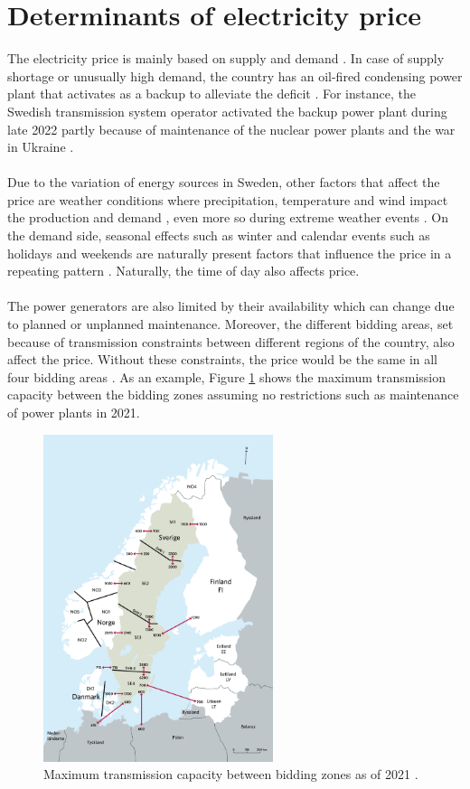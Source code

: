\section{Determinants of electricity price}\label{ch:factors}
The electricity price is mainly based on supply and demand \cite{NordPool}. In case of supply shortage or unusually high demand, the country has an oil-fired condensing power plant that activates as a backup to alleviate the deficit \cite{oilpower}. For instance, the Swedish transmission system operator activated the backup power plant during late 2022 partly because of maintenance of the nuclear power plants and the war in Ukraine \cite{affarsvarlden}. 
\\\\
Due to the variation of energy sources in Sweden, other factors that affect the price are weather conditions where precipitation, temperature and wind impact the production and demand \cite{determinants}, even more so during extreme weather events \cite{spatiotempweather}. On the demand side, seasonal effects such as winter and calendar events such as holidays and weekends are naturally present factors that influence the price in a repeating pattern \cite{WAGNER2022100246}. Naturally, the time of day also affects price.
\\\\
The power generators are also limited by their availability which can change due to planned or unplanned maintenance. Moreover, the different bidding areas, set because of transmission constraints between different regions of the country, also affect the price. Without these constraints, the price would be the same in all four bidding areas \cite{NordPool_capacities}. As an example, Figure \ref{fig:transmission} shows the maximum transmission capacity between the bidding zones assuming no restrictions such as maintenance of power plants in 2021. 

\begin{figure}[H]
    \centering
    \includegraphics[width=0.6\textwidth]{figures/transmission.png}
    \caption{Maximum transmission capacity between bidding zones as of 2021 \cite{transmission}.}
    \label{fig:transmission}
\end{figure}

